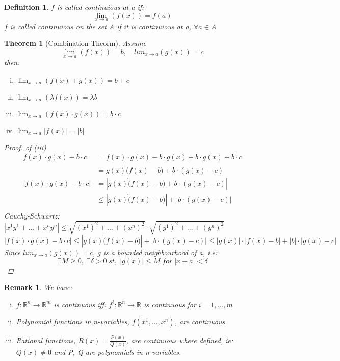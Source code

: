 \documentclass[11pt]{article}
\def\RR{\mathbb{R}}
\newtheorem{theorem}{Theorem}[section]
\newtheorem{definition}{Definition}[section]
\newtheorem*{remark}{Remark}
\begin{document}
\begin{definition}
$f$ is called continuious at a if:
\[\lim_{x\to a} (f(x))=f(a)\]
$f$ is called continuious on the set A if it is continuious at a, $\forall a \in A$
\end{definition}

\begin{theorem}[Combination Theorm]\label{T:Combination Theorm}
Assume \[\lim_{x\to a} (f(x))=b, \quad lim_{x\to a} (g(x))=c\]
then:
\begin{enumerate}[(i)]
\item$\lim_{x\to a} (f(x) + g(x))=b+c$
\item$\lim_{x\to a} (\lambda f(x))=\lambda b$
\item$\lim_{x\to a} (f(x)\cdot g(x))=b\cdot c$
\item$\lim_{x\to a} |f(x)|=|b|$
\end{enumerate}
\begin{proof}
of (iii)
\begin{align*}
f(x)\cdot g(x)-b\cdot c &= f(x)\cdot g(x) -b\cdot g(x) + b\cdot g(x) -b\cdot c \\
&= g(x)\dot (f(x)-b) + b\cdot (g(x) - c) \\
|f(x)\cdot g(x)-b\cdot c|&= |g(x)\dot (f(x)-b) + b\cdot (g(x) - c)|\\
 &\leq |g(x)\dot (f(x)-b)| +| b\cdot (g(x) - c)|\\
\end{align*}
Cauchy-Schwartz: $|x^{1}y^{1} + \dots +x^{n}y^{n}| \leq \sqrt{(x^{1})^{2} + \dots +(x^{n})^{2}} \cdot \sqrt{(y^{1})^{2} + \dots +(y^{n})^{2}}$
\[|f(x)\cdot g(x)-b\cdot c| \leq |g(x)\dot (f(x)-b)| +| b\cdot (g(x) - c)|  \leq |g(x)|\cdot |f(x)-b| +|b|\cdot |g(x) - c|\]
Since $ lim_{x\to a} (g(x))=c$, $g$ is a bounded neighbourhood of a, i.e: 
\[
\exists M  \geq 0, \; \exists \delta > 0 \; st,\; 
|g(x)| \leq M \; for \; |x-a|<\delta\] 
\end{proof}
\end{theorem}

\begin{remark} We have:\\
\begin{enumerate}[(i)]
\item $f:\RR^{n} \rightarrow \RR^{m}$ is continuous iff: $f^{i}:\RR^{n} \rightarrow \RR$ is continuous for $i=1,\dots , m$
\item Polynomial functions in n-variables, $f(x^{1}, \dots ,x^{n})$, are continuous
\item Rational functions, $R(x)= \frac{P(x)}{Q(x)}$, are continuous where defined, ie: $Q(x) \neq 0$ and P, Q are polynomials in n-variables.
\end{enumerate}
\end{remark}
\end{document}
